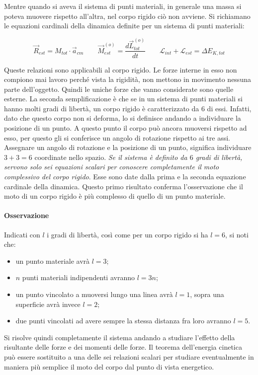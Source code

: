 Mentre quando si aveva il sistema di punti materiali, in generale una massa si poteva muovere rispetto all'altra, nel corpo rigido ciò non avviene. Si richiamano le equazioni cardinali della dinamica definite per un sistema di punti materiali:

\[
	\boxed{\vec{R}_{est} = M_{tot}\cdot \vec{a}_{cm} \qquad \vec{M}^{(o)}_{est} = \frac{d\vec{L}^{(o)}_{tot}}{dt} \qquad \mathcal{L}_{int} + \mathcal{L}_{est} = \Delta E_{K,tot}   }
\]

Queste relazioni sono applicabili al corpo rigido. Le forze interne in esso non compiono mai lavoro perché vista la rigidità, non mettono in movimento nessuna parte dell'oggetto. Quindi le uniche forze che vanno considerate sono quelle esterne. La seconda semplificazione è che se in un sistema di punti materiali si hanno molti gradi di libertà,  un corpo rigido è caratterizzato da $6$ di essi. Infatti, dato che questo corpo non si deforma, lo si definisce andando a individuare la posizione di un punto. A questo punto il corpo può ancora muoversi rispetto ad esso, per questo gli si conferisce un angolo di rotazione rispetto ai tre assi. Assegnare un angolo di rotazione e la posizione di un punto, significa individuare $3+3=6$ coordinate nello spazio. \emph{Se il sistema è definito da $6$ gradi di libertà, servono solo sei equazioni scalari per conoscere completamente il moto complessivo del corpo rigido}. Esse sono date dalla prima e la seconda equazione cardinale della dinamica. Questo primo risultato conferma l'osservazione che il moto di un corpo rigido è più complesso di quello di un punto materiale.

\paragraph{Osservazione} Indicati con $l$ i gradi di libertà, così come per un corpo rigido si ha $l=6$, si noti che:

\begin{itemize}
	\item un punto materiale avrà $l=3$;
	\item $n$ punti materiali indipendenti avranno $l=3n$;
	\item un punto vincolato a muoversi lungo una linea avrà $l=1$, sopra una superficie avrà invece $l=2$;
	\item due punti vincolati ad avere sempre la stessa distanza fra loro avranno $l=5$.
\end{itemize}

Si risolve quindi completamente il sistema andando a studiare l'effetto della risultante delle forze e dei momenti delle forze. Il teorema dell'energia cinetica può essere sostituito a una delle sei relazioni scalari per studiare eventualmente in maniera più semplice il moto del corpo dal punto di vista energetico.

